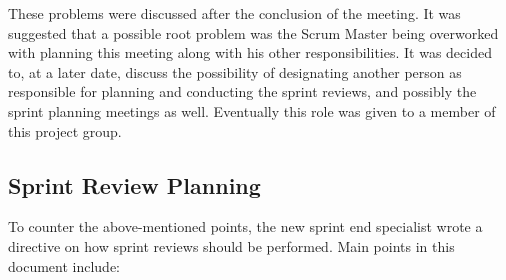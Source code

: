 These problems were discussed after the conclusion of the meeting. 
It was suggested that a possible root problem was the Scrum Master being overworked with planning this meeting along with his other responsibilities.
It was decided to, at a later date, discuss the possibility of designating another person as responsible for planning and conducting the sprint reviews, and possibly the sprint planning meetings as well.
Eventually this role was given to a member of this project group.

\subsection{Sprint Review Planning}
\label{collab:sprintend:planning}
To counter the above-mentioned points, the new sprint end specialist wrote a directive on how sprint reviews should be performed.
Main points in this document include:
